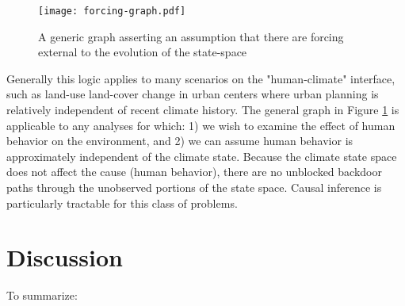 \documentclass[12pt]{article}
\begin{document}
\begin{figure}
  \texttt{[image: forcing-graph.pdf]}
  \caption{A generic graph asserting an assumption that there are
    forcing external to the evolution of the state-space}
  \label{fig:forcing}
\end{figure}

Generally this logic applies to many scenarios on the "human-climate"
interface, such as land-use land-cover change in urban centers where
urban planning is relatively independent of recent climate
history. The general graph in Figure \ref{fig:forcing} is applicable
to any analyses for which: 1) we wish to examine the effect of human
behavior on the environment, and 2) we can assume human behavior is
approximately independent of the climate state. Because the climate
state space does not affect the cause (human behavior), there are no
unblocked backdoor paths through the unobserved portions of the state
space. Causal inference is particularly tractable for this class of
problems.

\section{Discussion}

To summarize:
\end{document}
